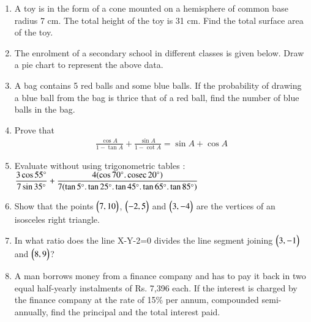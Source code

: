 \documentclass[journal,12pt,twocolumn]{IEEEtran}
\begin{document}
\begin{enumerate}
 \item A toy is in the form of a cone mounted on a hemisphere of common base radius 7 cm. The total height of the toy is 31 cm. Find the total surface area of the toy.
 
 \item The enrolment of a secondary school in different classes is given below. Draw a pie chart to represent the above data.
 \begin{table}[htb]
 \centering
 \caption{}
 \end{table}
 
 \item A bag contains 5 red balls and some blue balls. If the probability of drawing a blue ball from the bag is thrice that of a red ball, find the number of blue balls in the bag.
 
 \item Prove that
 \begin{align}
 \displaystyle\frac{\cos A}{1-\tan A}+\displaystyle\frac{\sin A}{1-\cot A}=\sin A+\cos A \nonumber
 \end{align}
 
 \item Evaluate without using trigonometric tables :\\
 \bigskip
 $\displaystyle\frac{3\cos55\degree}{7\sin35\degree}+\displaystyle\frac{4(\cos70\degree.\,\text{cosec}\,20\degree)}{7(\tan5\degree.\tan25\degree.\tan45\degree.\tan65\degree.\tan85\degree)}$
 
 \item Show that the points $\begin{pmatrix}7,10\end{pmatrix} $, $\begin{pmatrix}-2,5\end{pmatrix} $ and $\begin{pmatrix}3,-4\end{pmatrix} $ are the vertices of an isosceles right triangle.
 
 \item In what ratio does the line X-Y-2=0 divides the line segment joining  $\begin{pmatrix}3,-1\end{pmatrix} $ and  $\begin{pmatrix}8,9\end{pmatrix} $? 
 
 \item A man borrows money from a finance company and has to pay it back in two equal half-yearly instalments of Rs. 7,396 each. If the interest is charged by the finance company at the rate of 15\%  per annum, compounded semi-annually, find the principal and the total interest paid.
 \bigskip

\end{enumerate}
\end{document}
